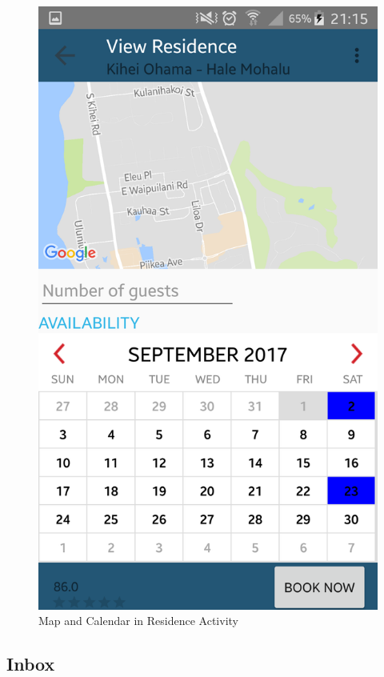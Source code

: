 \documentclass[12pt]{article}
\begin{document}
\begin{figure}
\begin{center}
			\includegraphics[scale=0.12, keepaspectratio]{10-Residence03.png} 
		\end{center}
		\caption{Map and Calendar in Residence Activity}
	\end{figure}
	
	\subsection{Inbox}
	
\end{document}
